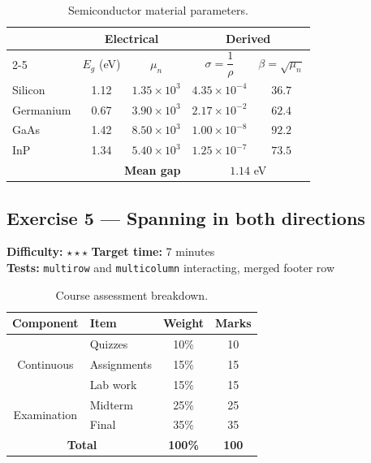 \documentclass[11pt]{article}
\newcommand{\exinfo}[3]{%
  \par\noindent
  \colorbox{RoyalBlue!12}{\parbox{0.97\textwidth}{\small
  \textbf{Difficulty:} #1 \qquad \textbf{Target time:} #2 \\
  \textbf{Tests:} #3}}\par\medskip}
\begin{document}
\begin{table}[H]
\centering
\caption{Semiconductor material parameters.}
\renewcommand{\arraystretch}{1.5}
\begin{tabular}{|l|cc|cc|}
\hline
\rowcolor{Gray!35}
\multirow{2}{*}{\textbf{Material}} &
  \multicolumn{2}{c|}{\textbf{Electrical}} &
  \multicolumn{2}{c|}{\textbf{Derived}} \\
\cline{2-5}
\rowcolor{Gray!20}
 & $E_g$ (eV) & $\mu_n$ & $\sigma = \dfrac{1}{\rho}$ & $\beta = \sqrt{\mu_n}$ \\
\hline
\rowcolor{Yellow!15} Silicon   & 1.12 & $1.35\times10^{3}$  & $4.35\times10^{-4}$ & $36.7$ \\
\rowcolor{Yellow!25} Germanium & 0.67 & $3.90\times10^{3}$  & $2.17\times10^{-2}$ & $62.4$ \\
\rowcolor{Cyan!15}   GaAs      & 1.42 & $8.50\times10^{3}$  & $1.00\times10^{-8}$ & $92.2$ \\
\rowcolor{Cyan!25}   InP       & 1.34 & $5.40\times10^{3}$  & $1.25\times10^{-7}$ & $73.5$ \\
\hline
\multicolumn{3}{|r|}{\cellcolor{Green!15}\textbf{Mean gap}} &
  \multicolumn{2}{c|}{\cellcolor{Green!15}$1.14$ eV} \\
\hline
\end{tabular}
\end{table}

\subsection*{Exercise 5 --- Spanning in both directions}
\exinfo{$\star\star\star$}{7 minutes}{\texttt{multirow} and
\texttt{multicolumn} interacting, merged footer row}

\begin{table}[H]
\centering
\caption{Course assessment breakdown.}
\renewcommand{\arraystretch}{1.4}
\begin{tabular}{|c|l|c|c|}
\hline
\textbf{Component} & \textbf{Item} & \textbf{Weight} & \textbf{Marks} \\
\hline
\multirow{3}{*}{Continuous}
  & Quizzes      & 10\% & 10 \\ \cline{2-4}
  & Assignments  & 15\% & 15 \\ \cline{2-4}
  & Lab work     & 15\% & 15 \\
\hline
\multirow{2}{*}{Examination}
  & Midterm      & 25\% & 25 \\ \cline{2-4}
  & Final        & 35\% & 35 \\
\hline
\multicolumn{2}{|c|}{\textbf{Total}} & \textbf{100\%} & \textbf{100} \\
\hline
\end{tabular}
\end{table}
\end{document}

